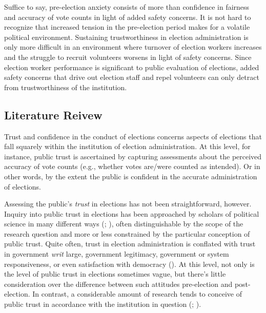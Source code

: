 \documentclass[
  12pt,
  letterpaper,
]{article}
\begin{document}
Suffice to say, pre-election anxiety consists of more than confidence in
fairness and accuracy of vote counts in light of added safety concerns.
It is not hard to recognize that increased tension in the pre-election
period makes for a volatile political environment. Sustaining
trustworthiness in election administration is only more difficult in an
environment where turnover of election workers increases and the
struggle to recruit volunteers worsens in light of safety concerns.
Since election worker performance is significant to public evaluation of
elections, added safety concerns that drive out election staff and repel
volunteers can only detract from trustworthiness of the institution.

\subsection{Literature Reivew}\label{literature-reivew}

Trust and confidence in the conduct of elections concerns aspects of
elections that fall squarely within the institution of election
administration. At this level, for instance, public trust is ascertained
by capturing assessments about the perceived accuracy of vote counts
(e.g., whether votes are/were counted as intended). Or in other words,
by the extent the public is confident in the accurate administration of
elections.

Assessing the public's \emph{trust} in elections has not been
straightforward, however. Inquiry into public trust in elections has
been approached by scholars of political science in many different ways
(;
), often distinguishable by the
scope of the research question and more or less constrained by the
particular conception of public trust. Quite often, trust in election
administration is conflated with trust in government \emph{writ} large,
government legitimacy, government or system responsiveness, or even
satisfaction with democracy (). At this level, not only is the level of public trust in
elections sometimes vague, but there's little consideration over the
difference between such attitudes pre-election and post-election. In
contrast, a considerable amount of research tends to conceive of public
trust in accordance with the institution in question
(;
).
\end{document}
